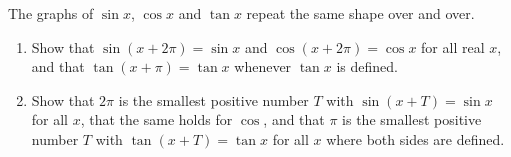 The graphs of $\sin x$, $\cos x$ and $\tan x$ repeat the same shape over and over.
\begin{enumerate}
\item[(a)] Show that $\sin(x+2\pi)=\sin x$ and $\cos(x+2\pi)=\cos x$ for all real $x$, and that $\tan(x+\pi)=\tan x$ whenever $\tan x$ is defined.
\item[(b)] Show that $2\pi$ is the smallest positive number $T$ with $\sin(x+T)=\sin x$ for all $x$, that the same holds for $\cos$, and that $\pi$ is the smallest positive number $T$ with $\tan(x+T)=\tan x$ for all $x$ where both sides are defined.
\end{enumerate}
